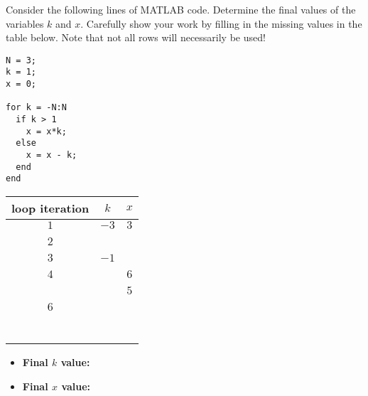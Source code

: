 \documentclass[11pt]{exam}
\theoremstyle{definition}
\begin{document}
\begin{questions}

\addpoints

\question[10]\mbox{}

Consider the following lines of MATLAB code.  Determine the final values of the variables $k$ and $x$.  Carefully show your work by filling in the missing values in the table below.  Note that not all rows will necessarily be used!

\vspace{0.5in}
\begin{lstlisting}
N = 3;
k = 1;
x = 0;

for k = -N:N
  if k > 1
    x = x*k;
  else
    x = x - k;
  end
end
\end{lstlisting}
\vspace{0.5in}

\begin{center}
\begin{tabular}{|c|c|c|}\hline
loop iteration & $k$ & $x$\\\hline
$1$ & $-3$ & $3$ \\\hline&&\\
$2$ &      &     \\\hline&&\\
$3$ & $-1$ &     \\\hline&&\\
$4$ &      & $6$ \\\hline&&\\
    &      & $5$ \\\hline&&\\
$6$ &      &     \\\hline&&\\
&&\\\hline&&\\
&&\\\hline&&\\
&&\\\hline&&\\
\end{tabular}
\end{center}

\vspace{0.3in}

\begin{itemize}
\item \textbf{Final $k$ value:}
\item \textbf{Final $x$ value:}
\end{itemize}

\newpage
\question[10]\mbox{}


\end{questions}
\end{document}

